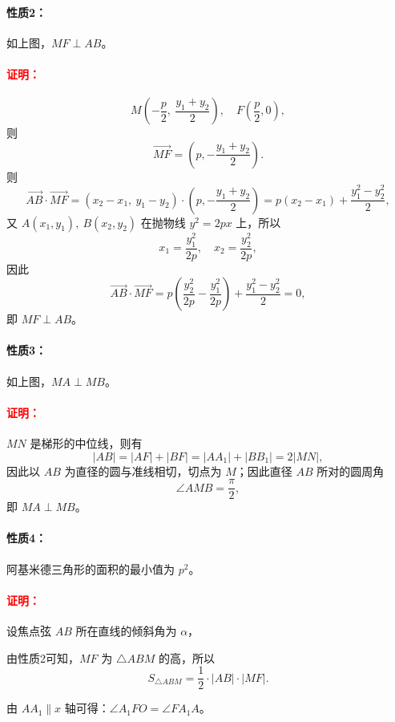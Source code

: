 \documentclass{ctexart}
\begin{document}
	\paragraph{\textcolor{green!60!black}{性质2：}}
	如上图，$MF\perp AB$。
	
	\paragraph{\textcolor{red}{证明：}}
	\[
	M\left(-\frac{p}{2},\ \frac{y_1+y_2}{2}\right),\quad F\left(\frac{p}{2},0\right),
	\]
	则
	\[
	\overrightarrow{MF}=\left(p,-\frac{y_1+y_2}{2}\right).
	\]
	则
	\[
	\overrightarrow{AB}\cdot\overrightarrow{MF}
	=(x_2-x_1,\ y_1-y_2)\cdot\left(p,-\frac{y_1+y_2}{2}\right)
	= p(x_2-x_1)+\frac{y_1^2-y_2^2}{2},
	\]
	又 $A(x_1,y_1),\ B(x_2,y_2)$ 在抛物线 $y^2=2px$ 上，所以
	\[
	x_1=\frac{y_1^2}{2p},\quad x_2=\frac{y_2^2}{2p},
	\]
	因此
	\[
	\overrightarrow{AB}\cdot\overrightarrow{MF}
	= p\!\left(\frac{y_2^2}{2p}-\frac{y_1^2}{2p}\right)+\frac{y_1^2-y_2^2}{2}=0,
	\]
	即 $MF\perp AB$。
	
	\paragraph{\textcolor{green!60!black}{性质3：}}
	如上图，$MA\perp MB$。
	
	\paragraph{\textcolor{red}{证明：}}
	$MN$ 是梯形的中位线，则有
	\[
	|AB|=|AF|+|BF|=|AA_1|+|BB_1|=2|MN|,
	\]
	因此以 $AB$ 为直径的圆与准线相切，切点为 $M$；因此直径 $AB$ 所对的圆周角
	\[
	\angle AMB=\frac{\pi}{2},
	\]
	即 $MA\perp MB$。
	
	\paragraph{\textcolor{green!60!black}{性质4：}}
	阿基米德三角形的面积的最小值为 $p^2$。
	
	\paragraph{\textcolor{red}{证明：}}
	设焦点弦 $AB$ 所在直线的倾斜角为 $\alpha$，
	
	由性质2可知，$MF$ 为 $\triangle ABM$ 的高，所以
	\[
	S_{\triangle ABM}=\frac12\cdot|AB|\cdot|MF|.
	\]
	
	由 $AA_1\parallel x$ 轴可得：$\angle A_1FO=\angle FA_1A$。
	
\end{document}
